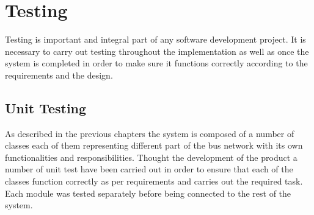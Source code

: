 \chapter{Testing}
Testing is important and integral part of any software development project. It is necessary to carry out testing throughout the implementation as well as once the system is completed in order to make sure it functions correctly according to the requirements and the design.

\section{Unit Testing} 
As described in the previous chapters the system is composed of a number of classes each of them representing different part of the bus network with its own functionalities and responsibilities. Thought the development of the product a number of unit test have been carried out in order to ensure that each of the classes function correctly as per requirements and carries out the required task. Each module was tested separately before being connected to the rest of the system.

